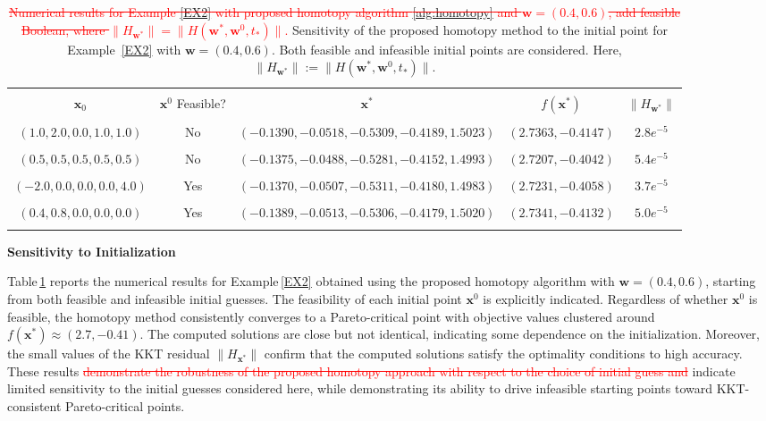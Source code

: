 \documentclass[11pt,pdflatex,sn-mathphys-ay]{sn-jnl}%
\theoremstyle{definition}
\theoremstyle{thmstyleone}%
\theoremstyle{thmstyletwo}%
\theoremstyle{thmstylethree}%
\newcommand{\del}[1]{\textcolor{red}{\sout{#1}}}
\newcommand{\add}[1]{\textcolor{revisionblue}{#1}}
\begin{document}
	
	\begin{table}[h]
		\centering
		\caption{\del{Numerical results for Example \ref{EX2} with proposed homotopy algorithm \ref{alg:homotopy} and $\textbf{w} = (0.4, 0.6)$, add feasible Boolean, where $\|H_{\textbf{w}^*}\| = \|H (\textbf{w}^*, \textbf{w}^0, t_*)\|.$} \add{Sensitivity of the proposed homotopy method to the initial
				point for Example~\ref{EX2} with $\bm{w}=(0.4,0.6)$.
				Both feasible and infeasible initial points are considered.
				Here,
				$\|H_{\textbf{w}^*}\|
				:=\|H(\textbf{w}^*,\textbf{w}^0,t_*)\|$.}}
		\begin{tabular}{c c c c c}
			\toprule[1.5pt] \\
			$\bm{x}_0$ & $\bm{x}^0$ \add{Feasible?} & $\bm{x}^*$ & $f(\bm{x}^*)$ & $\|H_{\textbf{w}^*}\|$ \\
			\\
			\midrule
			$(1.0, 2.0, 0.0, 1.0, 1.0)$ & No & $ (-0.1390, -0.0518, -0.5309, -0.4189, 1.5023)$ & $(2.7363, -0.4147)$ & $2.8e^{-5}$ \\ 
			\\
			$(0.5, 0.5, 0.5, 0.5, 0.5)$ & No & $(-0.1375, -0.0488,  -0.5281,  -0.4152, 1.4993)$ & $( 2.7207, -0.4042)$ & $5.4e^{-5}$ \\ 
			\\
			$(-2.0, 0.0, 0.0, 0.0, 4.0)$ & Yes & $ (-0.1370, -0.0507, -0.5311, -0.4180,  1.4983)$ & $(2.7231, -0.4058)$ & $3.7e^{-5}$ \\ 
			\\
			$(0.4, 0.8, 0.0, 0.0, 0.0)$ & Yes & $ (-0.1389, -0.0513, -0.5306, -0.4179, 1.5020)$ & $(2.7341, -0.4132)$ & $5.0e^{-5}$ \\ 
			\\
			\toprule[1.5pt]
		\end{tabular}
		\label{tab:homotopyEX2}
	\end{table}
	
	
	\medskip\noindent \textbf{Sensitivity to Initialization}
	
	Table\,\ref{tab:homotopyEX2} reports the numerical results for
	Example\,\ref{EX2} obtained using the proposed homotopy algorithm with
	$\textbf{w}=(0.4,0.6)$, starting from both feasible and infeasible
	initial guesses. The feasibility of each initial point $\bm{x}^0$ is
	explicitly indicated. Regardless of whether $\bm{x}^0$ is feasible, the
	homotopy method consistently converges to a Pareto-critical point with
	objective values clustered around $f(\bm{x}^*)\approx(2.7,-0.41)$.
	\add{The computed solutions are close but not identical, indicating some
		dependence on the initialization.}
	Moreover, the small values of the KKT residual
	$\lVert H_{\bm{x}^*}\rVert$ confirm that the computed solutions satisfy
	the optimality conditions to high accuracy. These results
	\del{demonstrate the robustness of the proposed homotopy approach with
		respect to the choice of initial guess and}
	\add{indicate limited sensitivity to the initial guesses considered here,
		while demonstrating}
	its ability to drive infeasible starting points toward KKT-consistent
	Pareto-critical points.
	
\end{document}
